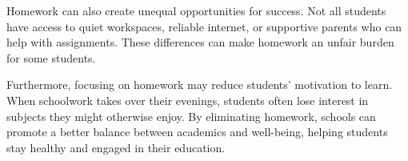 \documentclass[12pt]{article}
\begin{document}
\begin{tcolorbox}[colframe=black!60, colback=white, 
coltitle=black, colbacktitle=black!15, fonttitle=\bfseries\Large, 
title=Independent Practice, halign title=center, left=10pt, right=10pt, top=10pt, bottom=15pt]
Homework can also create unequal opportunities for success. Not all students have access to quiet workspaces, reliable internet, or supportive parents who can help with assignments. These differences can make homework an unfair burden for some students. 

Furthermore, focusing on homework may reduce students’ motivation to learn. When schoolwork takes over their evenings, students often lose interest in subjects they might otherwise enjoy.  By eliminating homework, schools can promote a better balance between academics  and well-being, helping students stay healthy and engaged in their education.
 


\end{tcolorbox}

\vspace{1em}
\end{document}
